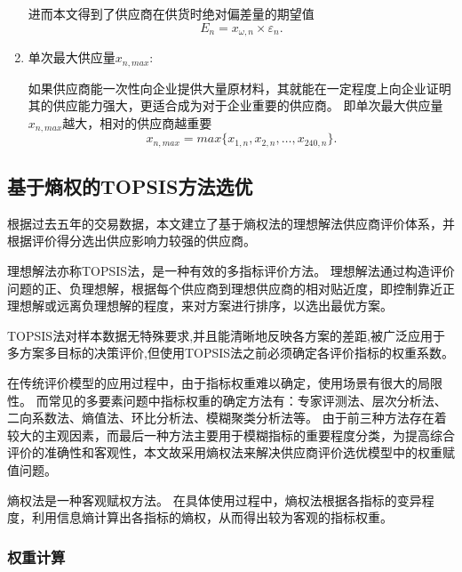 \begin{enumerate}
进而本文得到了供应商在供货时绝对偏差量的期望值
\begin{equation}
    E_n=x_{\omega,n} \times \varepsilon_n.
\end{equation}

\item 单次最大供应量$x_{n,max}$:

如果供应商能一次性向企业提供大量原材料，其就能在一定程度上向企业证明其的供应能力强大，更适合成为对于企业重要的供应商。
即单次最大供应量$x_{n,max}$越大，相对的供应商越重要
\begin{equation}
    x_{n,max}=max \{ x_{1,n},x_{2,n},\dots,x_{240,n} \}.
\end{equation}

\end{enumerate}

\subsection{基于熵权的TOPSIS方法选优}
\label{选优}

根据过去五年的交易数据，本文建立了基于熵权法的理想解法供应商评价体系，并根据评价得分选出供应影响力较强的供应商。

理想解法亦称TOPSIS法，是一种有效的多指标评价方法。
理想解法通过构造评价问题的正、负理想解，根据每个供应商到理想供应商的相对贴近度，即控制靠近正理想解或远离负理想解的程度，来对方案进行排序，以选出最优方案。

TOPSIS法对样本数据无特殊要求,并且能清晰地反映各方案的差距,被广泛应用于多方案多目标的决策评价\cite{金王莉2018基于熵权},但使用TOPSIS法之前必须确定各评价指标的权重系数。

在传统评价模型的应用过程中，由于指标权重难以确定，使用场景有很大的局限性。
而常见的多要素问题中指标权重的确定方法有：专家评测法、层次分析法、二向系数法、熵值法、环比分析法、模糊聚类分析法等。
由于前三种方法存在着较大的主观因素，而最后一种方法主要用于模糊指标的重要程度分类，为提高综合评价的准确性和客观性，本文故采用熵权法来解决供应商评价选优模型中的权重赋值问题\cite{供应链}。


熵权法是一种客观赋权方法。
在具体使用过程中，熵权法根据各指标的变异程度，利用信息熵计算出各指标的熵权，从而得出较为客观的指标权重。


\subsubsection{权重计算}

